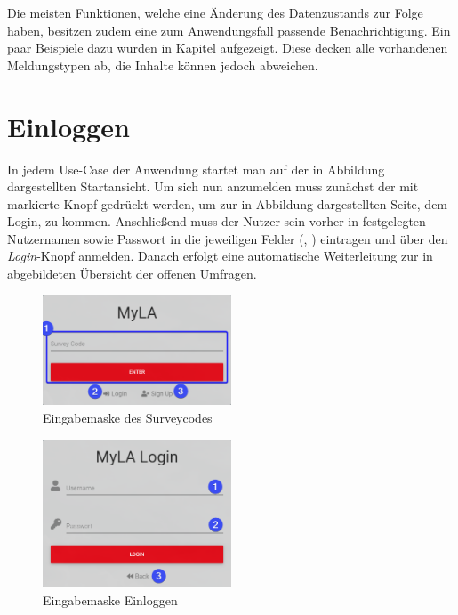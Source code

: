 Die meisten Funktionen, welche eine Änderung des Datenzustands zur Folge haben, besitzen zudem eine zum Anwendungsfall passende Benachrichtigung.
Ein paar Beispiele dazu wurden in Kapitel  aufgezeigt.
Diese decken alle vorhandenen Meldungstypen ab, die Inhalte können jedoch abweichen.

\section{Einloggen}
\label{ssec:Einloggen}

In jedem Use-Case der Anwendung startet man auf der in Abbildung  dargestellten Startansicht.
Um sich nun anzumelden muss zunächst der mit \desTwo markierte Knopf gedrückt werden, um zur in Abbildung  dargestellten Seite, dem Login, zu kommen.
Anschließend muss der Nutzer sein vorher in  festgelegten Nutzernamen sowie Passwort in die jeweiligen Felder (\desOne, \desTwo) eintragen und über den \emph{Login}-Knopf anmelden.
Danach erfolgt eine automatische Weiterleitung zur in  abgebildeten Übersicht der offenen Umfragen.

\begin{figure}[H]
	\centering
	\includegraphics[width=0.5\textwidth, keepaspectratio]{img/guide/SurveyCode.png}
	\captionsetup{justification=centering, format=plain}
	\caption[Eingabemaske Surveycode]{Eingabemaske des Surveycodes \\\quelleScreenshot}
	\label{fig:EingabemaskeSurveycode}
\end{figure}

\begin{figure}[H]
	\centering
	\includegraphics[width=0.5\textwidth, keepaspectratio]{img/guide/Login.png}
	\captionsetup{justification=centering, format=plain}
	\caption[Eingabemaske Einloggen]{Eingabemaske Einloggen \\\quelleScreenshot}
	\label{fig:Einloggen}
\end{figure} 

